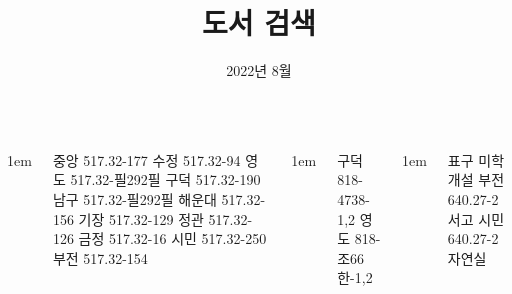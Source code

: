 \documentclass[	20pt, 
							a1paper, 
							portrait, %
							margin=0mm, %
							innermargin=10mm,  		%
							colspace=5mm, 
							subcolspace=0mm
							]{tikzposter}
\title{도서 검색}
\author{ 2022년 8월 }
\begin{document}
	\maketitle

	\begin{columns}


			{
					\setlength{\leftmargini}{7em}
					\setlength{\labelsep} {1em}
				\begin{LARGE}
중앙    517.32-177    
수정    517.32-94      
영도    517.32-필292필   
구덕    517.32-190    
남구    517.32-필292필  
해운대  517.32-156    %
기장    517.32-129     %
정관    517.32-126    %
금정   517.32-16       %
시민    517.32-250    %
부전     517.32-154  %
				\end{LARGE}
			}

			{
					\setlength{\leftmargini}{7em}
					\setlength{\labelsep} {1em}
				\begin{LARGE}
구덕    818-4738-1,2   	%
영도    818-조66한-1,2 	%

				\end{LARGE}
			}


			{
					\setlength{\leftmargini}{4em}
					\setlength{\labelsep} {1em}
				\begin{LARGE}
표구 미학 개설
부전  640.27-2  서고  		%
시민  640.27-2  자연실  	%
				\end{LARGE}
			}




\end{columns}
\end{document}
